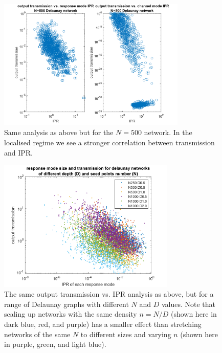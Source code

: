 \begin{figure}[hbp]
  \centering
    \includegraphics[width=0.8\textwidth]{ch3/fig3/IPRvsT_N500dexample.png}
    \caption{Same analysis as above but for the $N=500$ network. In the localised regime we see a stronger correlation between transmission and IPR.} 
    \label{fig:IPRvsT_N500}
\end{figure}

\begin{figure}[htp]
  \centering
    \includegraphics[width=0.75\textwidth]{ch3/fig3/compare_delaunay.png}
    \caption{The same output transmission vs. IPR analysis as above, but for a range of Delaunay graphs with different $N$ and $D$ values. Note that scaling up networks with the same density $n=N/D$ (shown here in dark blue, red, and purple) has a smaller effect than stretching networks of the same $N$ to different sizes and varying $n$ (shown here in purple, green, and light blue).} 
    \label{fig:compare_delaunay}
\end{figure}


